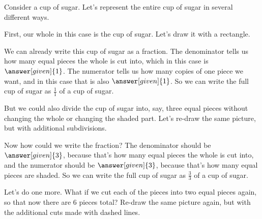 \documentclass{ximera}
\begin{document}
\begin{example}
Consider a cup of sugar. Let's represent the entire cup of sugar in several different ways.

First, our whole in this case is the cup of sugar. Let's draw it with a rectangle.

\begin{image} \end{image}

We can already write this cup of sugar as a fraction. The denominator tells us how many equal pieces the whole is cut into, which in this case is $\answer[given]{1}$. The numerator tells us how many copies of one piece we want, and in this case that is also $\answer[given]{1}$. So we can write the full cup of sugar as $\frac{1}{1}$ of a cup of sugar.

But we could also divide the cup of sugar into, say, three equal pieces without changing the whole or changing the shaded part. Let's re-draw the same picture, but with additional subdivisions.

\begin{image} \end{image}

Now how could we write the fraction? The denominator should be $\answer[given]{3}$, because that's how many equal pieces the whole is cut into, and the numerator should be $\answer[given]{3}$, because that's how many equal pieces are shaded. So we can write the full cup of sugar as $\frac{3}{3}$ of a cup of sugar.

Let's do one more. What if we cut each of the pieces into two equal pieces again, so that now there are $6$ pieces total? Re-draw the same picture again, but with the additional cuts made with dashed lines.

\begin{image} \end{image}


\end{example}
\end{document}
